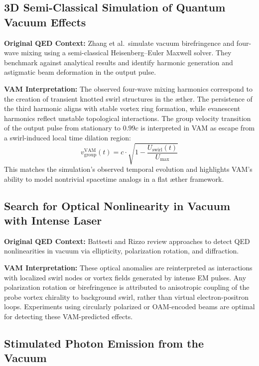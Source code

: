 \documentclass[12pt]{article}
\begin{document}
\subsection{3D Semi-Classical Simulation of Quantum Vacuum Effects~\cite{zhang2025computational}}

\textbf{Original QED Context:} Zhang et al.\ simulate vacuum birefringence and four-wave mixing using a semi-classical Heisenberg--Euler Maxwell solver. They benchmark against analytical results and identify harmonic generation and astigmatic beam deformation in the output pulse.

\textbf{VAM Interpretation:} The observed four-wave mixing harmonics correspond to the creation of transient knotted swirl structures in the \ae{}ther. The persistence of the third harmonic aligns with stable vortex ring formation, while evanescent harmonics reflect unstable topological interactions. The group velocity transition of the output pulse from stationary to $0.99c$ is interpreted in VAM as escape from a swirl-induced local time dilation region:
\begin{equation}
v_\text{group}^\text{VAM}(t) = c \cdot \sqrt{1 - \frac{U_\text{swirl}(t)}{U_\text{max}}}
\end{equation}
This matches the simulation's observed temporal evolution and highlights VAM's ability to model nontrivial spacetime analogs in a flat \ae{}ther framework.

\subsection{Search for Optical Nonlinearity in Vacuum with Intense Laser~\cite{battesti2013search}}

\textbf{Original QED Context:} Battesti and Rizzo review approaches to detect QED nonlinearities in vacuum via ellipticity, polarization rotation, and diffraction.

\textbf{VAM Interpretation:} These optical anomalies are reinterpreted as interactions with localized swirl nodes or vortex fields generated by intense EM pulses. Any polarization rotation or birefringence is attributed to anisotropic coupling of the probe vortex chirality to background swirl, rather than virtual electron-positron loops. Experiments using circularly polarized or OAM-encoded beams are optimal for detecting these VAM-predicted effects.

\subsection{Stimulated Photon Emission from the Vacuum~\cite{karbstein2016stimulated}}
\end{document}
